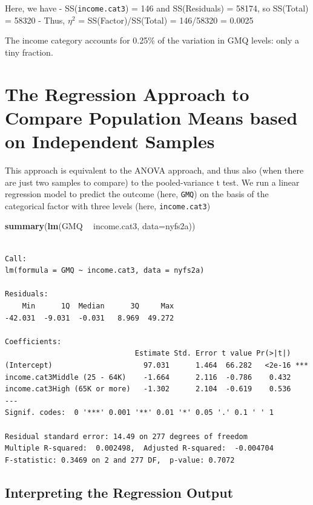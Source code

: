 \documentclass[
]{book}
\newenvironment{Shaded}{\begin{snugshade}}{\end{snugshade}}
\newcommand{\DataTypeTok}[1]{\textcolor[rgb]{0.13,0.29,0.53}{#1}}
\newcommand{\KeywordTok}[1]{\textcolor[rgb]{0.13,0.29,0.53}{\textbf{#1}}}
\newcommand{\NormalTok}[1]{#1}
\newcommand{\OperatorTok}[1]{\textcolor[rgb]{0.81,0.36,0.00}{\textbf{#1}}}
\newcommand{\StringTok}[1]{\textcolor[rgb]{0.31,0.60,0.02}{#1}}
\begin{document}
Here, we have
- SS(\texttt{income.cat3}) = 146 and SS(Residuals) = 58174, so SS(Total) = 58320
- Thus, \(\eta^2\) = SS(Factor)/SS(Total) = 146/58320 = 0.0025

The income category accounts for 0.25\% of the variation in GMQ levels: only a tiny fraction.

\hypertarget{the-regression-approach-to-compare-population-means-based-on-independent-samples}{%
\section{The Regression Approach to Compare Population Means based on Independent Samples}\label{the-regression-approach-to-compare-population-means-based-on-independent-samples}}

This approach is equivalent to the ANOVA approach, and thus also (when there are just two samples to compare) to the pooled-variance t test. We run a linear regression model to predict the outcome (here, \texttt{GMQ}) on the basis of the categorical factor with three levels (here, \texttt{income.cat3})

\begin{Shaded}
\begin{Highlighting}[]
\KeywordTok{summary}\NormalTok{(}\KeywordTok{lm}\NormalTok{(GMQ }\OperatorTok{~}\StringTok{ }\NormalTok{income.cat3, }\DataTypeTok{data=}\NormalTok{nyfs2a))}
\end{Highlighting}
\end{Shaded}

\begin{verbatim}

Call:
lm(formula = GMQ ~ income.cat3, data = nyfs2a)

Residuals:
    Min      1Q  Median      3Q     Max 
-42.031  -9.031  -0.031   8.969  49.272 

Coefficients:
                              Estimate Std. Error t value Pr(>|t|)    
(Intercept)                     97.031      1.464  66.282   <2e-16 ***
income.cat3Middle (25 - 64K)    -1.664      2.116  -0.786    0.432    
income.cat3High (65K or more)   -1.302      2.104  -0.619    0.536    
---
Signif. codes:  0 '***' 0.001 '**' 0.01 '*' 0.05 '.' 0.1 ' ' 1

Residual standard error: 14.49 on 277 degrees of freedom
Multiple R-squared:  0.002498,	Adjusted R-squared:  -0.004704 
F-statistic: 0.3469 on 2 and 277 DF,  p-value: 0.7072
\end{verbatim}

\hypertarget{interpreting-the-regression-output}{%
\subsection{Interpreting the Regression Output}\label{interpreting-the-regression-output}}
\end{document}
